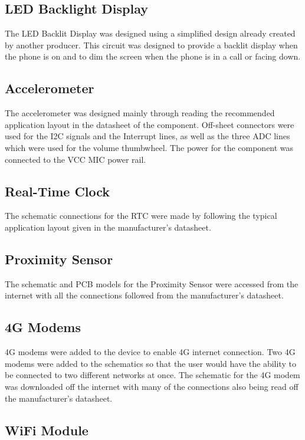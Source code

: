 \subsection{LED Backlight Display}

	The LED Backlit Display was designed using a simplified design already created by another producer. This circuit was designed to provide a backlit display when the phone is on and to dim the screen when the phone is in a call or facing down.

\subsection{Accelerometer}
\label{chap:a}
	The accelerometer was designed mainly through reading the recommended application layout in the datasheet of the component. Off-sheet connectors were used for the I2C signals and the Interrupt lines, as well as the three ADC lines which were used for the volume thumbwheel. The power for the component was connected to the VCC MIC power rail.

\subsection{Real-Time Clock}
\label{chap:RTC}
	The schematic connections for the RTC were made by following the typical application layout given in the manufacturer's datasheet.

\subsection{Proximity Sensor}
\label{chap:prox}
	The schematic and PCB models for the Proximity Sensor were accessed from the internet with all the connections followed from the manufacturer's datasheet. 

\subsection{4G Modems}
\label{chap:modem}
	4G modems were added to the device to enable 4G internet connection. Two 4G modems were added to the schematics so that the user would have the ability to be connected to two different networks at once.
The schematic for the 4G modem was downloaded off the internet with many of the connections also being read off the manufacturer's datasheet. 

\subsection{WiFi Module}

